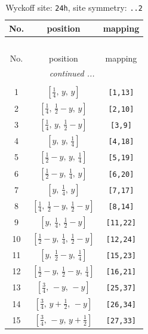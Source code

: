 \documentclass[fleqn,8pt]{jsarticle}
\begin{document}
\begin{longtable}{ccc}
\caption{Wyckoff site: {\tt 24h}, site symmetry: {\tt ..2}}
 \\
 \hline \hline
No. & position & mapping \\ \hline \endfirsthead

\multicolumn{2}{l}{\tablename\ \thetable{}} \\
 \hline \hline
No. & position & mapping \\ \hline \endhead

 \hline \hline
\multicolumn{2}{r}{\footnotesize\it continued ...} \\ \endfoot

 \hline \hline
\multicolumn{2}{r}{} \\ \endlastfoot

1 & $\left[ \frac{1}{4},\, y,\, y \right]$ & {\tt [1,13]} \\ \hline
2 & $\left[ \frac{1}{4},\, \frac{1}{2} - y,\, y \right]$ & {\tt [2,10]} \\ \hline
3 & $\left[ \frac{1}{4},\, y,\, \frac{1}{2} - y \right]$ & {\tt [3,9]} \\ \hline
4 & $\left[ y,\, y,\, \frac{1}{4} \right]$ & {\tt [4,18]} \\ \hline
5 & $\left[ \frac{1}{2} - y,\, y,\, \frac{1}{4} \right]$ & {\tt [5,19]} \\ \hline
6 & $\left[ \frac{1}{2} - y,\, \frac{1}{4},\, y \right]$ & {\tt [6,20]} \\ \hline
7 & $\left[ y,\, \frac{1}{4},\, y \right]$ & {\tt [7,17]} \\ \hline
8 & $\left[ \frac{1}{4},\, \frac{1}{2} - y,\, \frac{1}{2} - y \right]$ & {\tt [8,14]} \\ \hline
9 & $\left[ y,\, \frac{1}{4},\, \frac{1}{2} - y \right]$ & {\tt [11,22]} \\ \hline
10 & $\left[ \frac{1}{2} - y,\, \frac{1}{4},\, \frac{1}{2} - y \right]$ & {\tt [12,24]} \\ \hline
11 & $\left[ y,\, \frac{1}{2} - y,\, \frac{1}{4} \right]$ & {\tt [15,23]} \\ \hline
12 & $\left[ \frac{1}{2} - y,\, \frac{1}{2} - y,\, \frac{1}{4} \right]$ & {\tt [16,21]} \\ \hline
13 & $\left[ \frac{3}{4},\, - y,\, - y \right]$ & {\tt [25,37]} \\ \hline
14 & $\left[ \frac{3}{4},\, y + \frac{1}{2},\, - y \right]$ & {\tt [26,34]} \\ \hline
15 & $\left[ \frac{3}{4},\, - y,\, y + \frac{1}{2} \right]$ & {\tt [27,33]} \\ \hline

\end{longtable}
\end{document}
